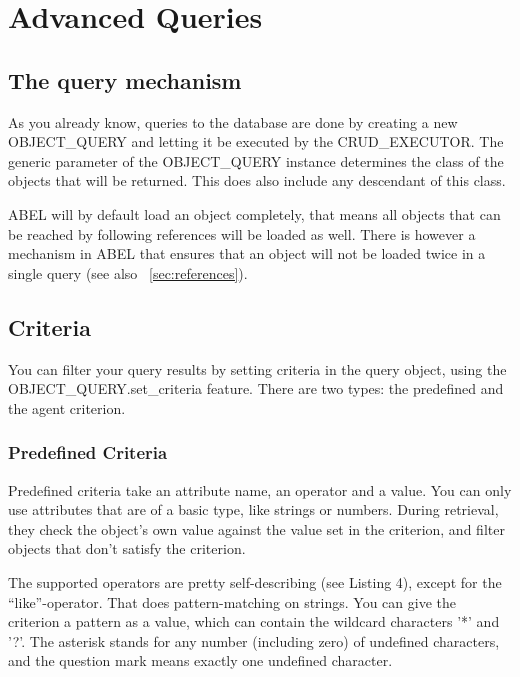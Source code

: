 \section{Advanced Queries}
\label{sec:query}

\subsection{The query mechanism}

As you already know, queries to the database are done by creating a new OBJECT\_QUERY and letting it be executed by the CRUD\_EXECUTOR.
The generic parameter of the OBJECT\_QUERY instance determines the class of the objects that will be returned. 
This does also include any descendant of this class.


ABEL will by default load an object completely, that means all objects that can be reached by following references will be loaded as well. 
There is however a mechanism in ABEL that ensures that an object will not be loaded twice in a single query (see also ~\ref{sec:references}).


\subsection{Criteria}

You can filter your query results by setting criteria in the query object, using the OBJECT\_QUERY.set\_criteria feature.
There are two types: the predefined and the agent criterion.

\subsubsection{Predefined Criteria}
Predefined criteria take an attribute name, an operator and a value. 
You can only use attributes that are of a basic type, like strings or numbers.
During retrieval, they check the object's own value against the value set in the criterion, and filter objects that don't satisfy the criterion.

The supported operators are pretty self-describing (see Listing 4), except for the ``like''-operator. 
That does pattern-matching on strings.
You can give the criterion a pattern as a value, which can contain the wildcard characters '*' and '?'.
The asterisk stands for any number (including zero) of undefined characters, and the question mark means exactly one undefined character.

